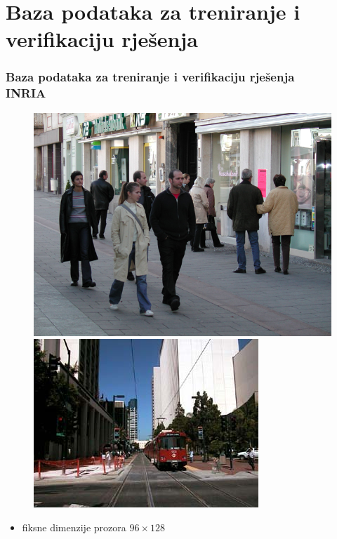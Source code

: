 \documentclass{beamer}
\begin{document}
\section{Baza podataka za treniranje i verifikaciju rješenja }
\begin{frame}
\frametitle{Baza podataka za treniranje i verifikaciju rješenja \\ INRIA \cite{Dollar:2012:PDE:2197081.2197275}}
\begin{figure}
\includegraphics{img/person_139.png}
\includegraphics[scale=0.3]{img/neg.png}
\end{figure}
\begin{itemize}
\item{fiksne dimenzije prozora $96 \times 128$}
\end{itemize}
\end{frame}
\end{document}
